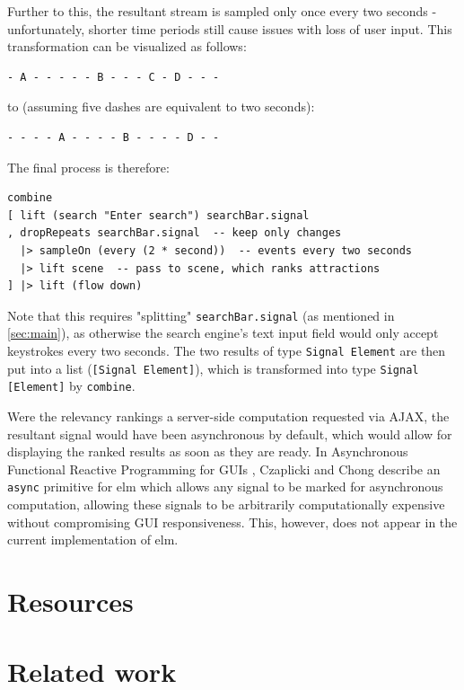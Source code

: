 \documentclass[12pt]{article}
\begin{document}
Further to this, the resultant stream is sampled only once every two seconds - unfortunately, shorter time periods still cause issues with loss of user input. This transformation can be visualized as follows:
\begin{samepage}
\begin{verbatim}
- A - - - - - B - - - C - D - - -
\end{verbatim}
to (assuming five dashes are equivalent to two seconds):
\begin{verbatim}
- - - - A - - - - B - - - - D - -
\end{verbatim}
\end{samepage}
The final process is therefore:
\begin{samepage}
\begin{verbatim}
combine
[ lift (search "Enter search") searchBar.signal
, dropRepeats searchBar.signal  -- keep only changes
  |> sampleOn (every (2 * second))  -- events every two seconds
  |> lift scene  -- pass to scene, which ranks attractions
] |> lift (flow down)
\end{verbatim}
\end{samepage}
Note that this requires "splitting" \texttt{searchBar.signal} (as mentioned in \ref{sec:main}), as otherwise the search engine's text input field would only accept keystrokes every two seconds. The two results of type \texttt{Signal Element} are then put into a list (\texttt{[Signal Element]}), which is transformed into type \texttt{Signal [Element]} by \texttt{combine}.

Were the relevancy rankings a server-side computation requested via AJAX, the resultant signal would have been asynchronous by default, which would allow for displaying the ranked results as soon as they are ready. In Asynchronous Functional Reactive Programming for GUIs \citet{czaplicki_chong_2013}, Czaplicki and Chong describe an \texttt{async} primitive for elm which allows any signal to be marked for asynchronous computation, allowing these signals to be arbitrarily computationally expensive without compromising GUI responsiveness. This, however, does not appear in the current implementation of elm.
\section{Resources}

\section{Related work}
\end{document}
